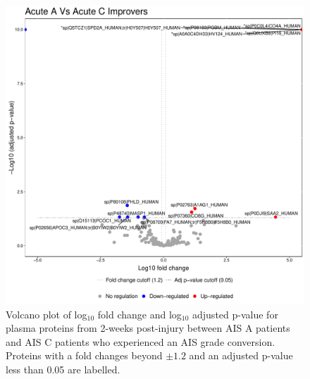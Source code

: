 \documentclass[9pt,lineno]{elife}
\begin{document}
\begin{figure}
\includegraphics[width=1\linewidth]{figures/openms_protein_quantification/label_free/volcano_plots/openms_volcano_plot_2021-08-10_0001} \caption{Volcano plot of log\(_10\) fold change and log\(_10\) adjusted p-value for plasma proteins from 2-weeks post-injury between AIS A patients and AIS C patients who experienced an AIS grade conversion. Proteins with a fold changes beyond \(\pm 1.2\) and an adjusted p-value less than 0.05 are labelled.}\label{fig:volc-plot-acute-a-vs-acute-c-imp}
\end{figure}
\end{document}
